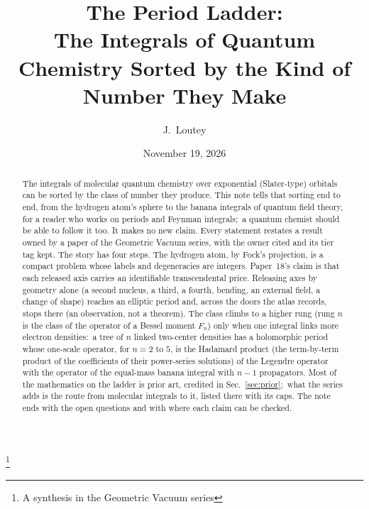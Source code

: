 \documentclass[aps,pra,twocolumn,superscriptaddress,longbibliography]{revtex4-2}
\begin{document}
\title{The Period Ladder:\\
The Integrals of Quantum Chemistry Sorted by the Kind of Number They Make}
\thanks{A synthesis in the Geometric Vacuum series}

\author{J.~Loutey}

\date{November 19, 2026}

\begin{abstract}
The integrals of molecular quantum chemistry over exponential
(Slater-type) orbitals can be sorted by the class of number they produce.
This note tells that sorting end to end, from the hydrogen atom's sphere
to the banana integrals of quantum field theory, for a reader who works
on periods and Feynman integrals;\ a quantum chemist should be able to
follow it too.  It makes no new claim.  Every statement restates a result
owned by a paper of the Geometric Vacuum series, with the owner cited and
its tier tag kept.  The story has four steps.  The hydrogen atom, by
Fock's projection, is a compact problem whose labels and degeneracies are
integers.  Paper~18's claim is that each released axis carries an
identifiable transcendental price.  Releasing axes by geometry alone (a
second nucleus, a third, a fourth, bending, an external field, a change
of shape) reaches an elliptic period and, across the doors the atlas
records, stops there (an observation, not a theorem).  The class climbs
to a higher rung (rung $n$ is the class of the operator of a Bessel
moment $F_n$) only when one integral links more electron densities:\ a tree of $n$ linked two-center densities has a
holomorphic period whose one-scale operator, for $n=2$ to $5$, is the
Hadamard product (the term-by-term product of the coefficients of their
power-series solutions) of the Legendre operator with the operator of the
equal-mass banana integral with $n-1$ propagators.  Most of the
mathematics on the ladder is prior art, credited in
Sec.~\ref{sec:prior};\ what the series adds is the route from molecular
integrals to it, listed there with its caps.  The note ends with the open
questions and with where each claim can be checked.
\end{abstract}

\maketitle

\end{document}
